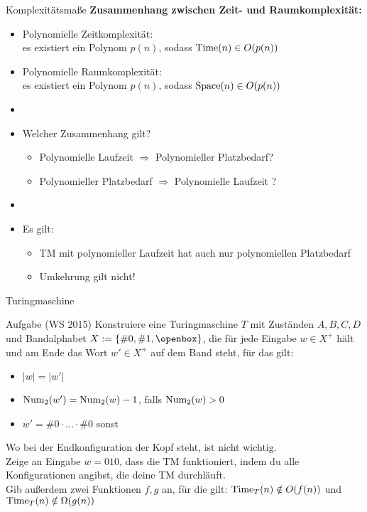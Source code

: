 \begin{frame}{Komplexitätsmaße}
    \textbf{Zusammenhang zwischen Zeit- und Raumkomplexität:}
    \begin{itemize}
    	\item Polynomielle Zeitkomplexität:\\
    	es existiert ein Polynom $p(n)$, sodass $\mathord{\text{Time}}(n) \in O(p(n))$
    	\item Polynomielle Raumkomplexität:\\
    	es existiert ein Polynom $p(n)$, sodass $\mathord{\text{Space}}(n) \in O(p(n))$
    	\pause
    	\item[]
    	\item Welcher Zusammenhang gilt?
    	\begin{itemize}
    		\item Polynomielle Laufzeit $\Rightarrow$ Polynomieller Platzbedarf?
    		\item Polynomieller Platzbedarf $\Rightarrow$ Polynomielle Laufzeit ?
    	\end{itemize}
    	\pause
    	\item[]
    	\item Es gilt:
    	\begin{itemize}
    		\item TM mit polynomieller Laufzeit hat auch nur polynomiellen Platzbedarf
    		\item Umkehrung gilt nicht!
    	\end{itemize}
    \end{itemize}
\end{frame}

\begin{frame}{Turingmaschine}
	\begin{exampleblock}{Aufgabe (WS 2015)}
		Konstruiere eine Turingmaschine $T$ mit Zuständen $A,B,C,D$ und Bandalphabet $X := \set{\#0, \#1, \blank}$, die für jede Eingabe $w \in X^+$ hält und am Ende das Wort $w'\in X^+$ auf dem Band steht, für das gilt:
		\begin{itemize}
			\item $|w|=|w'|$
			\item ${\text{Num}}_2(w')={\text{Num}}_2(w)-1$, falls ${\text{Num}}_2(w)>0$
			\item $w' = \#0 \cdot ... \cdot \#0$ sonst
		\end{itemize}
		Wo bei der Endkonfiguration der Kopf steht, ist nicht wichtig.\\
		Zeige an Eingabe $w = 010$, dass die TM funktioniert, indem du alle Konfigurationen angibst, die deine TM durchläuft.\\
		Gib außerdem zwei Funktionen $f,g$ an, für die gilt: $\mathord{\text{Time}}_T(n) \notin O(f(n))$ und $\mathord{\text{Time}}_T(n)\notin \Omega(g(n))$
	\end{exampleblock}
\end{frame}

